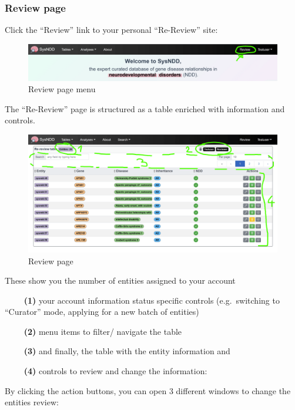 \documentclass[
]{article}
\begin{document}
\hypertarget{review-page}{%
\subsubsection{Review page}\label{review-page}}

Click the ``Review'' link to your personal ``Re-Review'' site:

\begin{figure}
\centering
\includegraphics{./static/img/sysndd_review_page_menu.png}
\caption{Review page menu}
\end{figure}

The ``Re-Review'' page is structured as a table enriched with information and controls.

\begin{figure}
\centering
\includegraphics{./static/img/sysndd_review_page.png}
\caption{Review page}
\end{figure}

These show you the number of entities assigned to your account

~~~~ \textbf{(1)} your account information status specific controls (e.g.~switching to ``Curator'' mode, applying for a new batch of entities)

~~~~ \textbf{(2)} menu items to filter/ navigate the table

~~~~ \textbf{(3)} and finally, the table with the entity information and

~~~~ \textbf{(4)} controls to review and change the information:

By clicking the action buttons, you can open 3 different windows to change the entities review:
\end{document}
